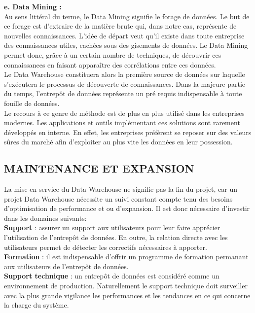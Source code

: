 \textbf{e. Data Mining :}\\
Au sens littéral du terme, le Data Mining signifie le forage de données. Le but de ce forage est d’extraire de la matière brute qui, dans notre cas, représente de nouvelles connaissances. L’idée de départ veut qu’il existe dans toute entreprise des connaissances utiles, cachées sous des gisements de données. Le Data Mining permet donc, grâce à un certain nombre de techniques, de découvrir ces connaissances en faisant apparaître des corrélations entre ces données.\\
Le Data Warehouse constituera alors la première source de données sur laquelle s’exécutera le processus de découverte de connaissances. Dans la majeure partie du temps, l’entrepôt de données représente un pré requis indispensable à toute fouille de données.\\
Le recours à ce genre de méthode est de plus en plus utilisé dans les entreprises modernes. Les applications et outils implémentant ces solutions sont rarement développés en interne. En effet, les entreprises préfèrent se reposer sur des valeurs sûres du marché afin d’exploiter au plus vite les données en leur possession.

 \subsection{MAINTENANCE ET EXPANSION}
 La mise en service du Data Warehouse ne signifie pas la fin du projet, car un projet
Data Warehouse nécessite un suivi constant compte tenu des besoins d’optimisation de performance et ou d’expansion. Il est donc nécessaire d’investir dans les domaines suivants:\\

\textbf{Support} : assurer un support aux utilisateurs pour leur faire apprécier l’utilisation de l’entrepôt de données. En outre, la relation directe avec les utilisateurs permet de détecter les  correctifs nécessaires à apporter.\\

\textbf{Formation} : il est indispensable d’offrir un programme de formation permanant aux utilisateurs de l’entrepôt de données.\\

\textbf{Support technique} : un entrepôt de données est considéré comme un environnement de production. Naturellement le support technique doit surveiller avec la plus grande vigilance les performances et les tendances en ce qui concerne la charge du système.\\


